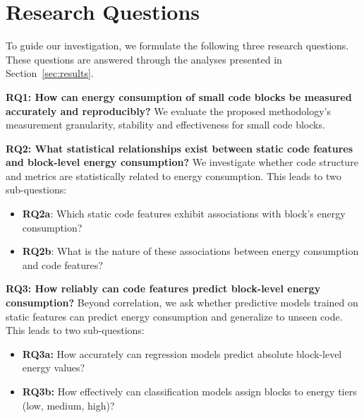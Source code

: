 \section{Research Questions}
\label{sec:research-questions}

To guide our investigation, we formulate the following three research questions. These questions are answered through the analyses presented in Section~\ref{sec:results}.

\textbf{RQ1: How can energy consumption of small code blocks be measured accurately and reproducibly?}  
We evaluate the proposed methodology's measurement granularity, stability and effectiveness for small code blocks.

\textbf{RQ2: What statistical relationships exist between static code features and block-level energy consumption?}  
We investigate whether code structure and metrics are statistically related to energy consumption. This leads to two sub-questions:
\begin{itemize}
  \item \textbf{RQ2a}: Which static code features exhibit associations with block's energy consumption?  
  \item \textbf{RQ2b}: What is the nature of these associations between energy consumption and code features?
\end{itemize}

\textbf{RQ3: How reliably can code features predict block-level energy consumption?}  
Beyond correlation, we ask whether predictive models trained on static features can predict energy consumption and generalize to unseen code. This leads to two sub-questions:
\begin{itemize}
  \item \textbf{RQ3a:} How accurately can regression models predict absolute block-level energy values?  
  \item \textbf{RQ3b:} How effectively can classification models assign blocks to energy tiers (low, medium, high)?  
\end{itemize}

